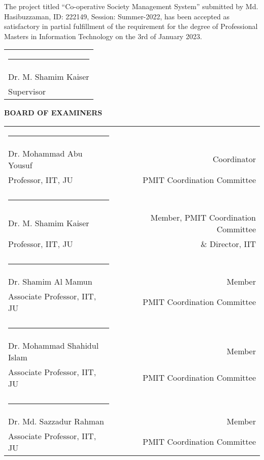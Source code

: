 The project titled “Co-operative Society Management
System” submitted by Md. Hasibuzzaman, ID: 222149, Session: Summer-2022, has been accepted as satisfactory in partial fulfillment of the requirement for the degree of Professional Masters in Information Technology on the 3rd of January 2023.


\bigskip
\bigskip
\bigskip

\noindent \begin{tabular}{l}

  \rule{4cm}{1pt} \\
  Dr. M. Shamim Kaiser\\ %
  Supervisor\\

\end{tabular}




\begin{center}
   \textbf{BOARD OF EXAMINERS}
\end{center}
\noindent \begin{tabular}{lp{1cm}r}
\centering
  \rule{4cm}{1pt}&\\
     Dr. Mohammad Abu Yousuf  &&Coordinator  \\
     Professor, IIT, JU  & & PMIT Coordination Committee  \\
     & &  \\
     \rule{4cm}{1pt}&\\
    Dr. M. Shamim Kaiser  & &Member, PMIT Coordination Committee   \\
     Professor, IIT, JU  & &\& Director, IIT\\
    & &  \\
     \rule{4cm}{1pt}&\\
     Dr. Shamim Al Mamun & &Member  \\
      Associate Professor, IIT, JU  & &PMIT Coordination Committee  \\
     &  \\
     \rule{4cm}{1pt}&\\
     Dr. Mohammad Shahidul Islam   & &Member  \\
      Associate Professor, IIT, JU  & &PMIT Coordination Committee  \\
      &  \\
     \rule{4cm}{1pt}&\\
     Dr. Md. Sazzadur Rahman  & &Member  \\
      Associate Professor, IIT, JU  & &PMIT Coordination Committee  \\
     
   

\end{tabular}


